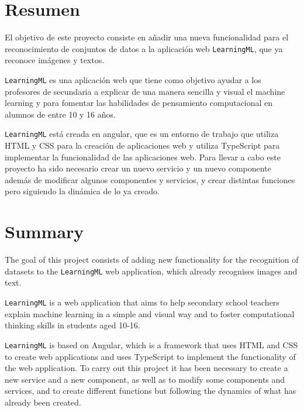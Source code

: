 \documentclass[a4paper, 12pt]{book}
\begin{document}

\chapter*{Resumen}

El objetivo de este proyecto consiste en añadir una nueva funcionalidad para el reconocimiento de conjuntos de datos a la aplicación web \texttt{LearningML}, que ya reconoce imágenes y textos.

\texttt{LearningML} es una aplicación web que tiene como objetivo ayudar a los profesores de secundaria a explicar de una manera sencilla y visual el machine learning y para fomentar las habilidades de pensamiento computacional en alumnos de entre 10 y 16 años.

\texttt{LearningML} está creada en angular, que es un entorno de trabajo que utiliza HTML y CSS para la creación de aplicaciones web y utiliza TypeScript para implementar la funcionalidad de las aplicaciones web. Para llevar a cabo este proyecto ha sido necesario crear un nuevo servicio y un nuevo componente además de modificar algunos componentes y servicios, y crear distintas funciones pero siguiendo la dinámica de lo ya creado.


\chapter*{Summary}

The goal of this project consists of adding new functionality for the recognition of datasets to the \texttt{LearningML} web application, which already recognises images and text.

\texttt{LearningML} is a web application that aims to help secondary school teachers explain machine learning in a simple and visual way and to foster computational thinking skills in students aged 10-16.

\texttt{LearningML} is based on Angular, which is a framework that uses HTML and CSS to create web applications and uses TypeScript to implement the functionality of the web application. To carry out this project it has been necessary to create a new service and a new component, as well as to modify some components and services, and to create different functions but following the dynamics of what has already been created.
\end{document}

